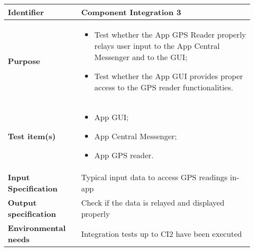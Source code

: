 
\begin{center}
\begin{tabular}{lp{}}
\toprule
\textbf{Identifier}		&	Component Integration 3\\
\midrule
\textbf{Purpose}		&	\begin{itemize}
					\item Test whether the App GPS Reader properly relays user input to the App Central Messenger and to the GUI;
					\item Test whether the App GUI provides proper access to the GPS reader functionalities.
					\end{itemize}	\\
\textbf{Test item(s)}	&	\begin{itemize}
					\item App GUI;
					\item App Central Messenger;
					\item App GPS reader.
					\end{itemize}	\\
\textbf{Input Specification}	&	Typical input data to access GPS readings in-app\\
\textbf{Output specification}	&	Check if the data is relayed and displayed properly\\
\textbf{Environmental needs}	&	Integration tests up to CI2 have been executed\\
\bottomrule
\end{tabular}
\end{center}


